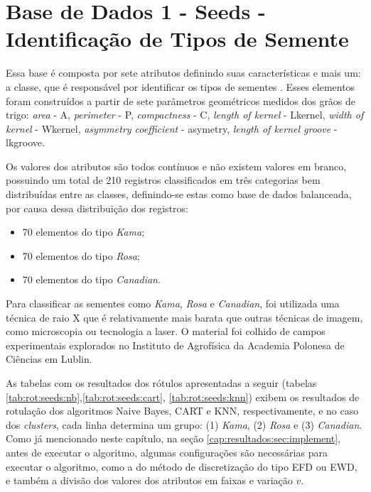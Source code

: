 \section{Base de Dados 1 - Seeds - Identificação de Tipos de Semente}
Essa base é composta por sete  atributos definindo suas características e mais um: a  classe, que é responsável por identificar os tipos de sementes \cite{Charytanowicz2010}. Esses elementos foram construídos a partir de sete parâmetros geométricos medidos dos grãos de trigo: \textit{area} - A, \textit{perimeter} - P, \textit{compactness} - C, \textit{length of kernel} - Lkernel, \textit{width of kernel} - Wkernel, \textit{asymmetry coefficient} - asymetry, \textit{length of kernel groove} - lkgroove.


Os valores dos atributos são todos contínuos e não existem valores em branco, possuindo um total de 210 registros classificados em três categorias bem distribuídas entre as classes, definindo-se estas como base de dados balanceada, por causa dessa distribuição dos registros:

\begin{itemize}[noitemsep]
 \item 70 elementos do tipo \textit{Kama};
 \item 70 elementos do tipo \textit{Rosa};
 \item 70 elementos do tipo \textit{Canadian}.
\end{itemize}


Para classificar as sementes como \textit{Kama}, \textit{Rosa} e \textit{Canadian}, foi utilizada uma técnica de raio X que é relativamente mais barata que outras técnicas de imagem, como microscopia ou tecnologia a laser. O material foi colhido de campos experimentais explorados no Instituto de Agrofísica da Academia Polonesa de Ciências em Lublin. 

As tabelas com os resultados dos rótulos apresentadas a seguir (tabelas \ref{tab:rot:seeds:nb},\ref{tab:rot:seeds:cart}, \ref{tab:rot:seeds:knn}) exibem os resultados de rotulação dos algoritmos Naive Bayes, CART e KNN, respectivamente, e no caso dos \textit{clusters}, cada linha determina um grupo: (1) \textit{Kama}, (2) \textit{Rosa} e (3) \textit{Canadian}. Como já mencionado neste capítulo, na seção \ref{cap:resultados:sec:implement}, antes de executar o algoritmo, algumas configurações são necessárias para executar o algoritmo, como a do método de discretização do tipo EFD ou EWD, e também a divisão dos valores dos atributos em faixas e variação ${v}$.

